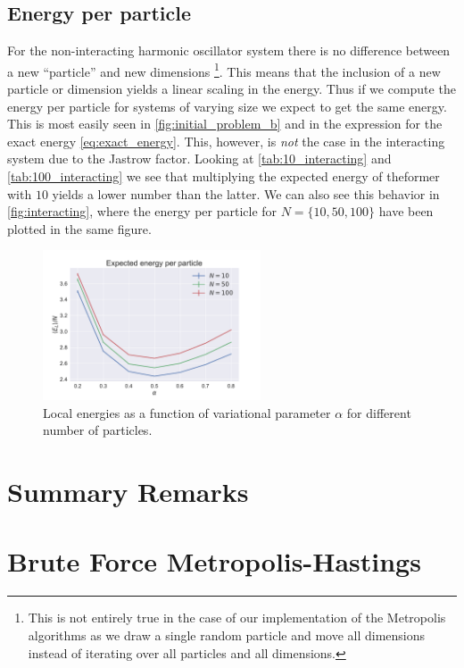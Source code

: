 \documentclass[
    a4paper, aps, twocolumn, floatfix, superscriptaddress, nofootinbib]{revtex4-1}
\newcommand{\1}{\mathds{1}}
\begin{document}
    \subsection{Energy per particle}
        For the non-interacting harmonic oscillator system there is no
        difference between a new ``particle'' and new dimensions
        \footnote{This is not entirely true in the case of our implementation of
        the Metropolis algorithms as we draw a single random particle and move
        all dimensions instead of iterating over all particles and all
        dimensions.}. This means that the inclusion of a new particle or
        dimension yields a linear scaling in the energy. Thus if we compute the
        energy per particle for systems of varying size we expect to get the
        same energy. This is most easily seen in \autoref{fig:initial_problem_b}
        and in the expression for the exact energy \autoref{eq:exact_energy}.
        This, however, is \textit{not} the case in the interacting system due to
        the Jastrow factor. Looking at \autoref{tab:10_interacting} and
        \autoref{tab:100_interacting} we see that multiplying the expected
        energy of theformer with $10$ yields a lower number than the latter. We
        can also see this behavior in \autoref{fig:interacting}, where the
        energy per particle for $N = \{10, 50, 100\}$ have been plotted in the
        same figure.

        \begin{figure}
            \includegraphics[width=244px]{../data/figures/problem_e.pdf}
            \caption{Local energies as a function of variational parameter
            $\alpha$ for different number of particles.}
            \label{fig:interacting}
        \end{figure}

\section{Summary Remarks}
	

\appendix
\section{Brute Force Metropolis-Hastings}
\end{document}
